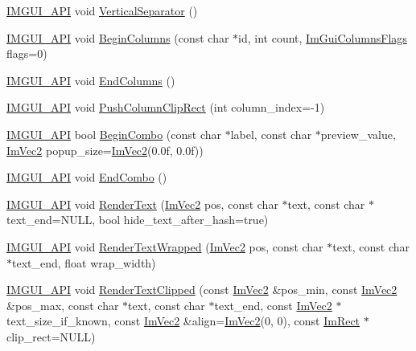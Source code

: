 \begin{DoxyCompactItemize}
\item 
\mbox{\hyperlink{imgui_8h_a43829975e84e45d1149597467a14bbf5}{I\+M\+G\+U\+I\+\_\+\+A\+PI}} void \mbox{\hyperlink{namespace_im_gui_ae60f7b8ece8808c477796e6594c8d796}{Vertical\+Separator}} ()
\item 
\mbox{\hyperlink{imgui_8h_a43829975e84e45d1149597467a14bbf5}{I\+M\+G\+U\+I\+\_\+\+A\+PI}} void \mbox{\hyperlink{namespace_im_gui_a4b0c247a5d091c5921c58de6bc8215aa}{Begin\+Columns}} (const char $\ast$id, int count, \mbox{\hyperlink{imgui_8h_a0edb3053546fcf6c5f7dcb7531c3a17a}{Im\+Gui\+Columns\+Flags}} flags=0)
\item 
\mbox{\hyperlink{imgui_8h_a43829975e84e45d1149597467a14bbf5}{I\+M\+G\+U\+I\+\_\+\+A\+PI}} void \mbox{\hyperlink{namespace_im_gui_af93bed3bce5475fe4d525d744f16aa20}{End\+Columns}} ()
\item 
\mbox{\hyperlink{imgui_8h_a43829975e84e45d1149597467a14bbf5}{I\+M\+G\+U\+I\+\_\+\+A\+PI}} void \mbox{\hyperlink{namespace_im_gui_abb20c9f8365cab62d9394ebb1dd5d769}{Push\+Column\+Clip\+Rect}} (int column\+\_\+index=-\/1)
\item 
\mbox{\hyperlink{imgui_8h_a43829975e84e45d1149597467a14bbf5}{I\+M\+G\+U\+I\+\_\+\+A\+PI}} bool \mbox{\hyperlink{namespace_im_gui_a08acc516e0de3cbb99f00774778a440a}{Begin\+Combo}} (const char $\ast$label, const char $\ast$preview\+\_\+value, \mbox{\hyperlink{struct_im_vec2}{Im\+Vec2}} popup\+\_\+size=\mbox{\hyperlink{struct_im_vec2}{Im\+Vec2}}(0.\+0f, 0.\+0f))
\item 
\mbox{\hyperlink{imgui_8h_a43829975e84e45d1149597467a14bbf5}{I\+M\+G\+U\+I\+\_\+\+A\+PI}} void \mbox{\hyperlink{namespace_im_gui_a63434692d7de278875c7ea0143fbe6e4}{End\+Combo}} ()
\item 
\mbox{\hyperlink{imgui_8h_a43829975e84e45d1149597467a14bbf5}{I\+M\+G\+U\+I\+\_\+\+A\+PI}} void \mbox{\hyperlink{namespace_im_gui_a9971ce57f2a288ac3a12df886c5550d1}{Render\+Text}} (\mbox{\hyperlink{struct_im_vec2}{Im\+Vec2}} pos, const char $\ast$text, const char $\ast$text\+\_\+end=N\+U\+LL, bool hide\+\_\+text\+\_\+after\+\_\+hash=true)
\item 
\mbox{\hyperlink{imgui_8h_a43829975e84e45d1149597467a14bbf5}{I\+M\+G\+U\+I\+\_\+\+A\+PI}} void \mbox{\hyperlink{namespace_im_gui_aa483b40f6899e1b289b4bf6c2673d1d2}{Render\+Text\+Wrapped}} (\mbox{\hyperlink{struct_im_vec2}{Im\+Vec2}} pos, const char $\ast$text, const char $\ast$text\+\_\+end, float wrap\+\_\+width)
\item 
\mbox{\hyperlink{imgui_8h_a43829975e84e45d1149597467a14bbf5}{I\+M\+G\+U\+I\+\_\+\+A\+PI}} void \mbox{\hyperlink{namespace_im_gui_ab362eafae794c7364a6b96ea06f38eb9}{Render\+Text\+Clipped}} (const \mbox{\hyperlink{struct_im_vec2}{Im\+Vec2}} \&pos\+\_\+min, const \mbox{\hyperlink{struct_im_vec2}{Im\+Vec2}} \&pos\+\_\+max, const char $\ast$text, const char $\ast$text\+\_\+end, const \mbox{\hyperlink{struct_im_vec2}{Im\+Vec2}} $\ast$text\+\_\+size\+\_\+if\+\_\+known, const \mbox{\hyperlink{struct_im_vec2}{Im\+Vec2}} \&align=\mbox{\hyperlink{struct_im_vec2}{Im\+Vec2}}(0, 0), const \mbox{\hyperlink{struct_im_rect}{Im\+Rect}} $\ast$clip\+\_\+rect=N\+U\+LL)

\end{DoxyCompactItemize}

